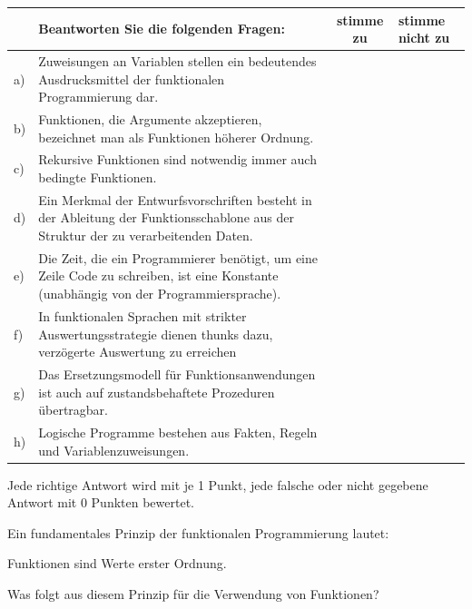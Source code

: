 \documentclass[12pt]{exam}
\begin{document}
\begin{questions}

\question[8]
\vspace{0.5cm}


\begin{tabular}{|l|p{10cm}|c|p{1.8 cm}|}
    \hline
    &Beantworten Sie die folgenden Fragen:&stimme zu&stimme nicht zu \\
    \hline
    
a)&Zuweisungen an Variablen stellen 
ein bedeutendes Ausdrucksmittel der funktionalen Programmierung dar.&&\\
\hline


b)&Funktionen, die Argumente akzeptieren, bezeichnet man als
    Funktionen höherer Ordnung.&&\\
\hline

c)&Rekursive Funktionen sind notwendig immer auch bedingte Funktionen.&&\\
\hline

d)&Ein Merkmal der Entwurfsvorschriften besteht in der Ableitung
der Funktionsschablone aus der Struktur der zu verarbeitenden Daten.&&\\
\hline

e)&Die Zeit, die ein Programmierer benötigt, um eine Zeile Code zu
  schreiben, ist eine Konstante (unabhängig von der Programmier\-sprache).&&\\
\hline

f)&In funktionalen Sprachen mit strikter Auswertungsstrategie dienen
    thunks dazu, verzögerte Auswertung zu erreichen&&\\
\hline

g)&Das Ersetzungsmodell für Funktionsanwendungen ist auch auf
    zustandsbehaftete Prozeduren übertragbar.&&\\
\hline

h)&Logische Programme bestehen aus Fakten, Regeln und Variablenzuweisungen.&&\\
\hline

\end{tabular}

Jede richtige Antwort wird mit je 1 Punkt, jede falsche oder nicht
gegebene Antwort mit 0 Punkten bewertet.

\pagebreak

\question[4]
Ein fundamentales Prinzip der funktionalen Programmierung lautet:
\begin{center}
Funktionen sind Werte erster Ordnung. 
\end{center}
Was folgt aus diesem Prinzip für die Verwendung von Funktionen?


\end{questions}
\end{document}

